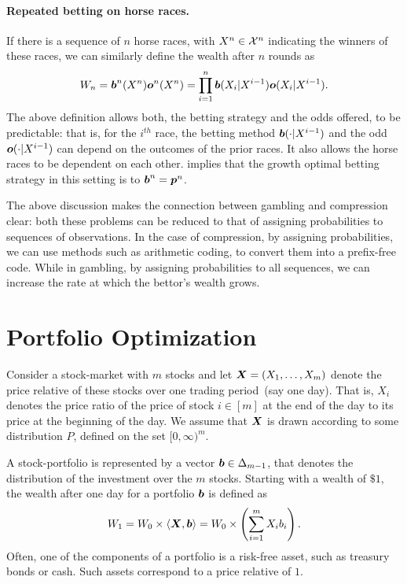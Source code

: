     \paragraph{Repeated betting on horse races.}
    If there is a sequence of $n$ horse races, with $X^n \in \mathcal{X}^n$ indicating the winners of these races, we can similarly define the wealth after $n$ rounds as
    \begin{align}
        W_n = \boldsymbol{b}^n(X^n) \boldsymbol{o}^n(X^n) = \prod_{i=1}^n \boldsymbol{b}(X_i|X^{i-1}) \boldsymbol{o}(X_i|X^{i-1}). 
    \end{align}
    The above definition allows both, the betting strategy and the odds offered, to be predictable: that is, for the $i^{th}$ race, the betting method $\boldsymbol{b}(\cdot|X^{i-1})$ and the odd $\boldsymbol{o}(\cdot|X^{i-1})$ can depend on the outcomes of the prior races. It also allows the horse races to be dependent on each other.  implies that the growth optimal betting strategy in this setting is to $\boldsymbol{b}^n = \boldsymbol{p}^n$. 
    \begin{remark}
        \label{remark:gambling-is-probability-assignment} The above discussion makes the connection between gambling and compression clear: both these problems can be reduced to that of assigning probabilities to sequences of observations. In the case of compression, by assigning probabilities, we can use methods such as arithmetic coding, to convert them into a prefix-free code. While in gambling, by assigning probabilities to all sequences, we can increase the rate at which the bettor's wealth grows. 
    \end{remark}

  
\section{Portfolio Optimization}
\label{sec:portfolio-optimization-1}
    Consider a stock-market with $m$ stocks and let $\boldsymbol{X} = (X_1, \ldots, X_m)$ denote the  price relative of these stocks over one trading period~(say one day). That is, $X_i$ denotes the price ratio of the price of stock $i \in [m]$ at the end of the day to its price at the beginning of the day. We assume that $\boldsymbol{X}$ is drawn according to some distribution $P$, defined on the set $[0, \infty)^m$. 

    A stock-portfolio is represented by a vector $\boldsymbol{b} \in \Delta_{m-1}$, that denotes the distribution of the investment over the $m$ stocks. Starting with a wealth of $\$1$, the wealth after one day for a portfolio $\boldsymbol{b}$ is defined as 
    \begin{align}
        W_1 = W_0 \times \langle \boldsymbol{X}, \boldsymbol{b} \rangle = W_0 \times \left( \sum_{i=1}^m X_i b_i \right). 
    \end{align}
    Often, one of the components of a portfolio is a risk-free asset, such as treasury bonds or cash. Such assets correspond to a price relative of $1$. 

